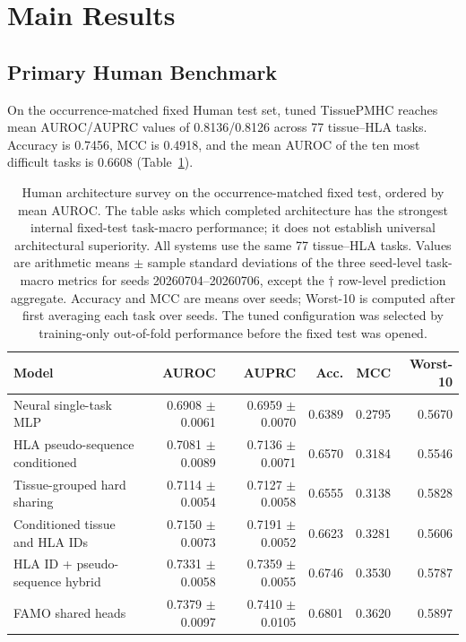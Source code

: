 \section{Main Results}

\subsection{Primary Human Benchmark}

On the occurrence-matched fixed Human test set, tuned TissuePMHC reaches mean AUROC/AUPRC values of 0.8136/0.8126 across 77 tissue--HLA tasks. Accuracy is 0.7456, MCC is 0.4918, and the mean AUROC of the ten most difficult tasks is 0.6608 (Table~\ref{tab:human-standard}).

\begin{table}[tbp]
\centering
\caption{Human architecture survey on the occurrence-matched fixed test, ordered by mean AUROC. The table asks which completed architecture has the strongest internal fixed-test task-macro performance; it does not establish universal architectural superiority. All systems use the same 77 tissue--HLA tasks. Values are arithmetic means $\pm$ sample standard deviations of the three seed-level task-macro metrics for seeds 20260704--20260706, except the $\dagger$ row-level prediction aggregate. Accuracy and MCC are means over seeds; Worst-10 is computed after first averaging each task over seeds. The tuned configuration was selected by training-only out-of-fold performance before the fixed test was opened.}
\label{tab:human-standard}
\scriptsize
\renewcommand{\arraystretch}{1.04}
\setlength{\tabcolsep}{2pt}
\begin{tabularx}{\textwidth}{>{\raggedright\arraybackslash}Xrrrrr}
\toprule
Model & AUROC & AUPRC & Acc. & MCC & Worst-10 \\
\midrule
Neural single-task MLP & 0.6908 $\pm$ 0.0061 & 0.6959 $\pm$ 0.0070 & 0.6389 & 0.2795 & 0.5670 \\
HLA pseudo-sequence conditioned & 0.7081 $\pm$ 0.0089 & 0.7136 $\pm$ 0.0071 & 0.6570 & 0.3184 & 0.5546 \\
Tissue-grouped hard sharing & 0.7114 $\pm$ 0.0054 & 0.7127 $\pm$ 0.0058 & 0.6555 & 0.3138 & 0.5828 \\
Conditioned tissue and HLA IDs & 0.7150 $\pm$ 0.0073 & 0.7191 $\pm$ 0.0052 & 0.6623 & 0.3281 & 0.5606 \\
HLA ID + pseudo-sequence hybrid & 0.7331 $\pm$ 0.0058 & 0.7359 $\pm$ 0.0055 & 0.6746 & 0.3530 & 0.5787 \\
FAMO shared heads & 0.7379 $\pm$ 0.0097 & 0.7410 $\pm$ 0.0105 & 0.6801 & 0.3620 & 0.5897 \\

\end{tabularx}
\end{table}
